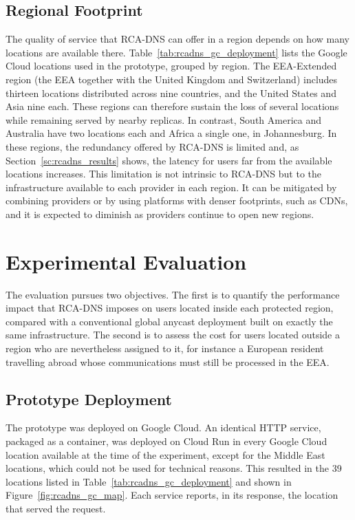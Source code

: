 \subsection{Regional Footprint}
\label{sc:rcadns_feasibility_footprint}

The quality of service that RCA-DNS can offer in a region depends on how many locations are available there. Table~\ref{tab:rcadns_gc_deployment} lists the Google Cloud locations used in the prototype, grouped by region. The EEA-Extended region (the EEA together with the United Kingdom and Switzerland) includes thirteen locations distributed across nine countries, and the United States and Asia nine each. These regions can therefore sustain the loss of several locations while remaining served by nearby replicas. In contrast, South America and Australia have two locations each and Africa a single one, in Johannesburg. In these regions, the redundancy offered by RCA-DNS is limited and, as Section~\ref{sc:rcadns_results} shows, the latency for users far from the available locations increases. This limitation is not intrinsic to RCA-DNS but to the infrastructure available to each provider in each region. It can be mitigated by combining providers or by using platforms with denser footprints, such as CDNs, and it is expected to diminish as providers continue to open new regions.

\section{Experimental Evaluation}
\label{sc:rcadns_evaluation}

The evaluation pursues two objectives. The first is to quantify the performance impact that RCA-DNS imposes on users located inside each protected region, compared with a conventional global anycast deployment built on exactly the same infrastructure. The second is to assess the cost for users located outside a region who are nevertheless assigned to it, for instance a European resident travelling abroad whose communications must still be processed in the EEA.

\subsection{Prototype Deployment}
\label{sc:rcadns_setup}

The prototype was deployed on Google Cloud. An identical HTTP service, packaged as a container, was deployed on Cloud Run in every Google Cloud location available at the time of the experiment, except for the Middle East locations, which could not be used for technical reasons. This resulted in the 39 locations listed in Table~\ref{tab:rcadns_gc_deployment} and shown in Figure~\ref{fig:rcadns_gc_map}. Each service reports, in its response, the location that served the request.

